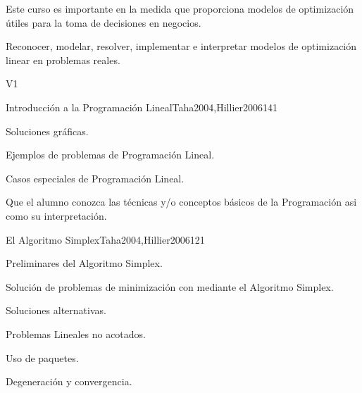 \begin{syllabus}


\begin{justification}
   Este curso es importante en la medida que proporciona modelos de optimización útiles para la toma de decisiones en negocios.
   \end{justification}
   
   \begin{goals}
   \item Reconocer, modelar, resolver, implementar e interpretar modelos de optimización linear en problemas reales.
   \end{goals}
   
   \begin{outcomes}{V1}
      \item {}
      \item {}
      \item {}
      \item {}
      \item{}
   \end{outcomes}
   
   \begin{unit}{Introducción a la Programación Lineal}{}{Taha2004,Hillier2006}{14}{1}
      \begin{topics}
         \item Soluciones gráficas.
         \item Ejemplos de problemas de Programación Lineal.
         \item Casos especiales de Programación Lineal.
      \end{topics}
   
      \begin{learningoutcomes}
         \item Que el alumno conozca las técnicas y/o conceptos básicos de la Programación asi como su interpretación.
      \end{learningoutcomes}
   \end{unit}
   
   \begin{unit}{El Algoritmo Simplex}{}{Taha2004,Hillier2006}{12}{1}
      \begin{topics}
         \item Preliminares del Algoritmo Simplex.
         \item Solución de problemas de minimización con mediante el Algoritmo Simplex.
         \item Soluciones alternativas.
         \item Problemas Lineales no acotados.
         \item Uso de paquetes.
         \item Degeneración y convergencia.
      \end{topics}
   

\end{unit}
\end{syllabus}
